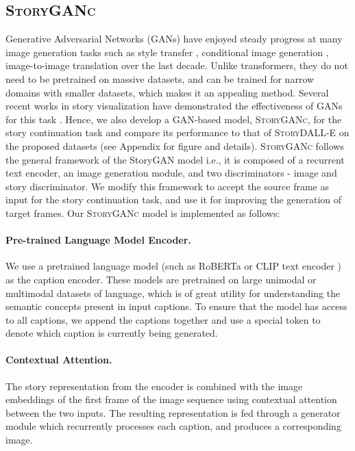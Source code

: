 \documentclass[runningheads]{llncs}
\newcommand{\sdalle}[1]{\textsc{StoryDALL-E}}
\newcommand{\sgan}[1]{\textsc{StoryGANc}}
\begin{document}
\subsection{\sgan{}}
Generative Adversarial Networks (GANs) have enjoyed steady progress at many image generation tasks such as style transfer \cite{karras2019style}, conditional image generation \cite{xu2018attngan}, image-to-image translation \cite{isola2017image} over the last decade. Unlike transformers, they do not need to be pretrained on massive datasets, and can be trained for narrow domains with smaller datasets, which makes it an appealing method. Several recent works in story visualization have demonstrated the effectiveness of GANs for this task \cite{li2019storygan, maharana2021improving, song2020CPCSV}. Hence, we also develop a GAN-based model, \sgan{}, for the story continuation task and compare its performance to that of \sdalle{} on the proposed datasets (see Appendix for figure and details). \sgan{} follows the general framework of the StoryGAN model \cite{li2019storygan} i.e., it is composed of a recurrent text encoder, an image generation module, and two discriminators - image and story discriminator. We modify this framework to accept the source frame as input for the story continuation task, and use it for improving the generation of target frames. Our \sgan{} model is implemented as follows:

\paragraph{Pre-trained Language Model Encoder.}
We use a pretrained language model (such as RoBERTa \cite{liu2019roberta} or CLIP text encoder \cite{radford2021learning}) as the caption encoder. These models are pretrained on large unimodal or multimodal datasets of language, which is of great utility for understanding the semantic concepts present in input captions. To ensure that the model has access to all captions, we append the captions together and use a special token to denote which caption is currently being generated.

\paragraph{Contextual Attention.}
The story representation from the encoder is combined with the image embeddings of the first frame of the image sequence using contextual attention \cite{yu2018generative} between the two inputs. The resulting representation is fed through a generator module which recurrently processes each caption, and produces a corresponding image.
\end{document}
